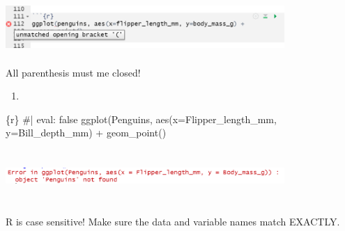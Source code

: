 \documentclass[
  letterpaper,
  DIV=11,
  numbers=noendperiod]{scrreprt}
\newenvironment{Shaded}{\begin{snugshade}}{\end{snugshade}}
\newcommand{\AttributeTok}[1]{\textcolor[rgb]{0.40,0.45,0.13}{#1}}
\newcommand{\CommentTok}[1]{\textcolor[rgb]{0.37,0.37,0.37}{#1}}
\newcommand{\FunctionTok}[1]{\textcolor[rgb]{0.28,0.35,0.67}{#1}}
\newcommand{\InformationTok}[1]{\textcolor[rgb]{0.37,0.37,0.37}{#1}}
\newcommand{\NormalTok}[1]{\textcolor[rgb]{0.00,0.23,0.31}{#1}}
\newcommand{\SpecialCharTok}[1]{\textcolor[rgb]{0.37,0.37,0.37}{#1}}
\newcommand{\StringTok}[1]{\textcolor[rgb]{0.13,0.47,0.30}{#1}}
\providecommand{\tightlist}{%
  \setlength{\itemsep}{0pt}\setlength{\parskip}{0pt}}\usepackage{longtable,booktabs,array}
\begin{document}
\begin{tcolorbox}[enhanced jigsaw, colframe=quarto-callout-note-color-frame, breakable, colback=white, toprule=.15mm, leftrule=.75mm, left=2mm, opacityback=0, rightrule=.15mm, arc=.35mm, bottomrule=.15mm]
\includegraphics[width=4.16667in,height=0.78125in]{images/images_lecture/error_2b.png}

All parenthesis must me closed!

\begin{enumerate}
\def\labelenumi{\arabic{enumi}.}
\setcounter{enumi}{2}
\tightlist
\item
\end{enumerate}

\begin{Shaded}
\begin{Highlighting}[]
\InformationTok{\textasciigrave{}\textasciigrave{}\textasciigrave{}\{r\}}
\CommentTok{\#| eval: false}
\FunctionTok{ggplot}\NormalTok{(Penguins, }\FunctionTok{aes}\NormalTok{(}\AttributeTok{x=}\NormalTok{Flipper\_length\_mm, }\AttributeTok{y=}\NormalTok{Bill\_depth\_mm) }\SpecialCharTok{+}
  \FunctionTok{geom\_point}\NormalTok{()}
\StringTok{\textasciigrave{}\textasciigrave{}\textasciigrave{}}
\end{Highlighting}
\end{Shaded}

\includegraphics[width=4.16667in,height=0.78125in]{images/images_lecture/error_2c.png}

R is case sensitive! Make sure the data and variable names match
EXACTLY.

\end{tcolorbox}
\end{document}
